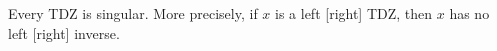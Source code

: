 Every TDZ is singular. More precisely, if $x$ is a left [right] TDZ, then $x$ has no left [right] inverse.

